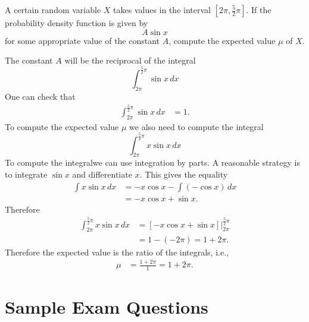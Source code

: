 \documentclass{ximera}
\begin{document}
\begin{question}%

A certain random variable \(X\) takes values in the interval \(\left[2 \pi , \frac{5}{2} \pi \right]\).
If the probability density function is given by
\[ A \sin {x} \]
 for some appropriate value of the constant \(A\),
compute the expected value \(\mu\) of \(X\).
\begin{multiplechoice}
\choice{\(\displaystyle \mu = 2 \pi\)}
\end{multiplechoice}
\begin{feedback}
The constant \(A\) will be the reciprocal of the integral
\[ \int_{2 \pi}^{\frac{5}{2} \pi} \sin {x}\, dx \]
 One can check that
\[ \begin{aligned} \int_{2 \pi}^{\frac{5}{2} \pi} \sin {x}\, dx & = 1. \end{aligned} \]
To compute the expected value \(\mu\) we also need to compute the integral 
\[ \int_{2 \pi}^{\frac{5}{2} \pi} x \sin {x}\, dx \]
 To compute the integralwe can use integration by parts. A reasonable strategy is to integrate  \(\sin {x}\) and differentiate  \(x\).
 This gives the equality
\[ \begin{aligned} \int x \sin {x}\, dx & = - x \cos {x} - \int \left(- \cos {x}\right)\, dx \\
 & = - x \cos {x} + \sin {x}. \end{aligned} \]
Therefore 
\[ \begin{aligned} \int_{2 \pi}^{\frac{5}{2} \pi} x \sin {x}\, dx & = \left. \left[- x \cos {x} + \sin {x} \right] \right|_{2 \pi}^{\frac{5}{2} \pi}\\ & = 1 - \left(- 2 \pi \right) = 1 + 2 \pi. \end{aligned} \]
Therefore the expected value is the ratio of the integrals, i.e.,
\[ \begin{aligned} \mu & = \frac{1 + 2 \pi}{1} = 1 + 2 \pi. \end{aligned} \]
\end{feedback}

\end{question}

\section*{Sample Exam Questions}
\end{document}
